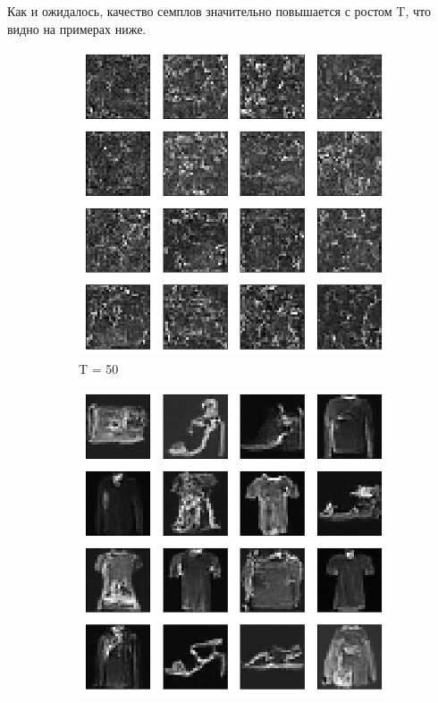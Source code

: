 \documentclass{article}
\begin{document}
Как и ожидалось, качество семплов значительно повышается с ростом T, что видно на примерах ниже. 
\begin{figure}[h!]
	\begin{subfigure}[h]{0.3\linewidth}
		\centering
		\includegraphics[scale=0.3]{../code/generated_DDPM_50.png}
		\caption{T = 50}
	\end{subfigure}
	\hfill
	\begin{subfigure}[h]{0.3\linewidth}
		\centering
		\includegraphics[scale=0.3]{../code/generated_DDPM_300.png}

\end{subfigure}
\end{figure}
\end{document}
